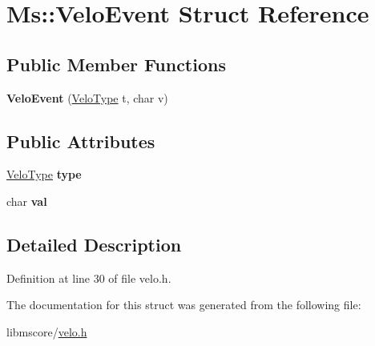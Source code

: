 \hypertarget{struct_ms_1_1_velo_event}{}\section{Ms\+:\+:Velo\+Event Struct Reference}
\label{struct_ms_1_1_velo_event}
\subsection*{Public Member Functions}
\begin{DoxyCompactItemize}
\item 
\mbox{\label{struct_ms_1_1_velo_event_ae58d23085d81abd5ce82fe4d4bdff27c}} 
{\bfseries Velo\+Event} (\hyperlink{namespace_ms_a956ce458826705343340d8d32826e21e}{Velo\+Type} t, char v)
\end{DoxyCompactItemize}
\subsection*{Public Attributes}
\begin{DoxyCompactItemize}
\item 
\mbox{\label{struct_ms_1_1_velo_event_a2bb5713ffda71f38370441eabd548dd6}} 
\hyperlink{namespace_ms_a956ce458826705343340d8d32826e21e}{Velo\+Type} {\bfseries type}
\item 
\mbox{\label{struct_ms_1_1_velo_event_a4c542046d2146aef4b8ec1ee00fd2d08}} 
char {\bfseries val}
\end{DoxyCompactItemize}


\subsection{Detailed Description}


Definition at line 30 of file velo.\+h.



The documentation for this struct was generated from the following file\+:\begin{DoxyCompactItemize}
\item 
libmscore/\hyperlink{velo_8h}{velo.\+h}\end{DoxyCompactItemize}
